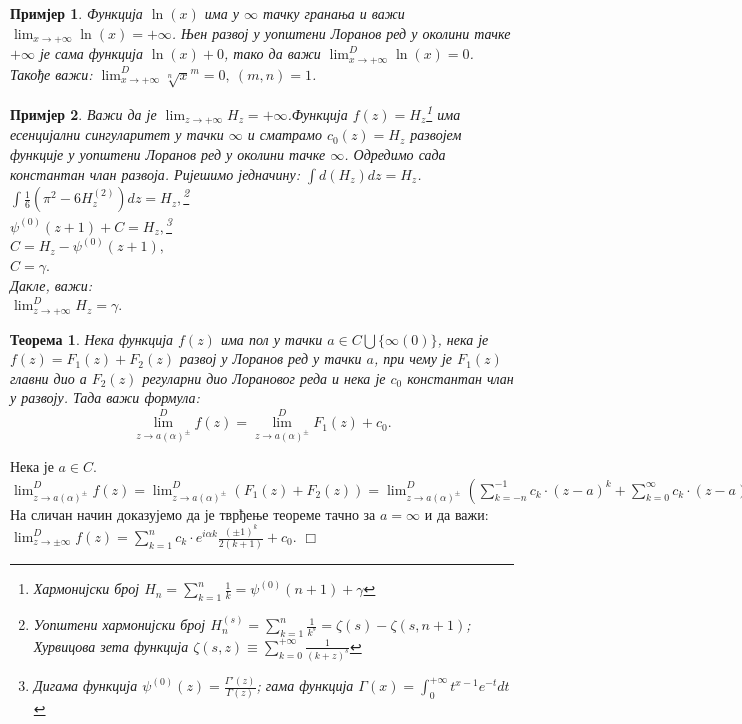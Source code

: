 \documentclass[12pt]{article}
\newtheorem{theorem}{Теорема}
\newtheorem{example}{Примјер}
\newenvironment{proof}{\noindent {\sc Доказ:}}{$\Box$ \medskip}
\begin{document}
\begin{example}
Функција $\ln(x)$ има у $\infty$ тачку гранања и важи $\lim_{x\to+\infty}\ln(x)=+\infty$. Њен развој у уопштени Лоранов ред у околини тачке $+\infty$ је сама функција $\ln(x)+0$, тако да важи $\lim^D_{x\to+\infty}\ln(x)=0$. Такође важи: $\lim^D_{x\to+\infty}\sqrt[n]x^m=0,\ (m,n)=1$.
\end{example}

\begin{example}
Важи да је $\lim_{z\to+\infty}H_z=+\infty$.Функција $f(z)=H_z$\footnote{Хармонијски број $H_n=\sum_{k=1}^n \frac{1}{k}=\psi^{(0)}(n+1)+\gamma$} има есенцијални сингуларитет у тачки $\infty$ и сматрамо $c_0(z)=H_z$ развојем функције у уопштени Лоранов ред у околини тачке $\infty$. Одредимо сада константан члан развоја. Ријешимо једначину: $\int d(H_z) dz=H_z$. \\
$\int \frac{1}{6}(\pi ^2-6 H_z^{(2)}) dz=H_z,$\footnote{Уопштени хармонијски број $H_n^{(s)}=\sum_{k=1}^n \frac{1}{k^s}=\zeta(s)-\zeta(s,n+1)$; Хурвицова зета функција $\zeta(s,z)\equiv\sum_{k=0}^{+\infty} \frac{1}{(k+z)^s}$}\\ 
$\psi^{(0)}(z+1)+C=H_z,$\footnote{Дигама функција $\psi^{(0)}(z)=\frac{\Gamma'(z)}{\Gamma(z)}$; гама функција $\Gamma(x)=\int_{0}^{+\infty} t^{x-1}e^{-t}dt$}\\
$C=H_z-\psi^{(0)}(z+1),$\\
$C=\gamma.$\\
Дакле, важи:\\
$\lim^D_{z\to +\infty}H_z=\gamma.$
\end{example}

\begin{theorem} Нека функција $f(z)$ има пол у тачки $a\in C\bigcup \{\infty(0)\}$, нека је $f(z)=F_1(z)+F_2(z)$ развој у Лоранов ред у тачки $a$, при чему је $F_1(z)$ главни дио а $F_2(z)$ регуларни дио Лорановог реда и нека је $c_0$ константан члан у развоју. Тада важи формула: $$\lim^D_{z\to a(\alpha)^\pm}f(z)=\lim^D_{z\to a(\alpha)^\pm}F_1(z)+c_0.$$ 
\end{theorem}

\begin{proof}
Нека је $a\in C$.\\
$\lim^D_{z\to a(\alpha)^\pm}f(z)=\lim^D_{z\to a(\alpha)^\pm}(F_1(z)+F_2(z))=\lim^D_{z\to a(\alpha)^\pm}(\sum_{k=-n}^{-1} c_k\cdot(z-a)^k+\sum_{k=0}^\infty c_k\cdot(z-a)^k)=\lim^D_{z\to a(\alpha)^\pm}\sum_{k=-n}^{-1} c_k\cdot(z-a)^k+\lim_{z\to a}\sum_{k=0}^\infty c_k\cdot(z-a)^k=\lim^D_{z\to a(\alpha)^\pm}F_1(z)+c_0=\lim^D_{z\to a(\alpha)^\pm}\sum_{k=1}^{n} c_{-k}\cdot (z-a)^{-k}+c_0=\lim^D_{r\to 0(0)^\pm}\sum_{k=1}^{n} c_{-k}\cdot (a+r^{-k}e^{-i\alpha k}-a)^{-k}+c_0=\sum_{k=1}^n c_{-k}\cdot e^{-i\alpha k} \lim^D_{r\to 0(0)^\pm} r^{-k}+c_0=\sum_{k=1}^n c_{-k}\cdot e^{-i\alpha k}(\mp\int_{\mp 1}^{\mp\infty} r^{-k-2} dr)+c_0=\sum_{k=1}^n c_{-k}\cdot e^{-i\alpha k}\frac{(\pm 1)^k}{k+1}+c_0=\sum_{k=-n}^{-1} c_{k}\cdot e^{i\alpha k}\frac{(\pm 1)^k}{2(-k+1)}+c_0.$\\ 
На сличан начин доказујемо да је тврђење теореме тачно за $a=\infty$ и да важи: $\lim^D_{z\to \pm\infty}f(z)=\sum_{k=1}^{n} c_{k}\cdot e^{i\alpha k}\frac{(\pm 1)^k}{2(k+1)}+c_0$.
\end{proof}
\end{document}

